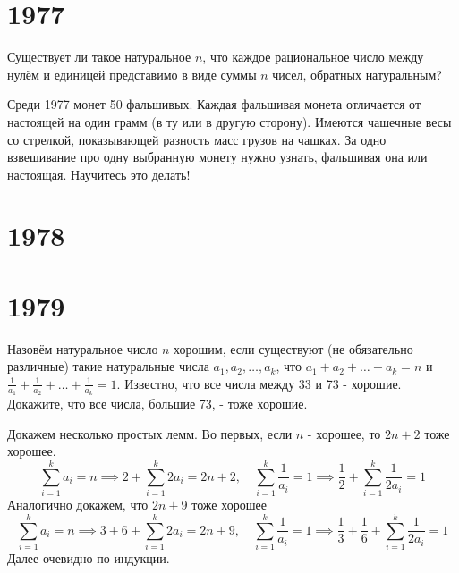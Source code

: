 \documentclass[11pt, a4paper]{template}
\begin{document}
\chapter{1977}

\begin{exercise}[M425]
Существует ли такое натуральное $n$, что каждое рациональное число между нулём и единицей представимо в виде суммы $n$ чисел, обратных натуральным?
\end{exercise}

\begin{exercise}[M466]
Среди 1977 монет 50 фальшивых. Каждая фальшивая монета отличается от настоящей на один грамм (в ту или в другую сторону). Имеются чашечные весы со стрелкой, показывающей разность масс грузов на чашках. За одно взвешивание про одну выбранную монету нужно узнать, фальшивая она или настоящая. Научитесь это делать!
\end{exercise}

\chapter{1978}

\chapter{1979}

\begin{exercise}[M554]
Назовём натуральное число $n$ хорошим, если существуют (не обязательно различные) такие натуральные числа $a_{1}, a_{2}, \dots, a_{k}$, что $a_{1} + a_{2} + \dots + a_{k} = n$ и $\frac{1}{a_{1}} + \frac{1}{a_{2}} + \dots + \frac{1}{a_{k}} = 1$. Известно, что все числа между 33 и 73 - хорошие. Докажите, что все числа, большие 73, - тоже хорошие.
\end{exercise}

\begin{solution}
Докажем несколько простых лемм. Во первых, если $n$ - хорошее, то $2n + 2$ тоже хорошее. 
$$
\sum_{i = 1}^{k} a_{i} = n \implies 2 + \sum_{i = 1}^{k} 2a_{i} = 2n + 2, \quad \sum_{i = 1}^{k} \frac{1}{a_{i}} = 1 \implies \frac{1}{2} + \sum_{i = 1}^{k} \frac{1}{2a_{i}} = 1
$$
Аналогично докажем, что $2n+9$ тоже хорошее
$$
\sum_{i = 1}^{k} a_{i} = n \implies 3 + 6 + \sum_{i = 1}^{k} 2a_{i} = 2n + 9, \quad \sum_{i = 1}^{k} \frac{1}{a_{i}} = 1 \implies \frac{1}{3} + \frac{1}{6} + \sum_{i = 1}^{k} \frac{1}{2a_{i}} = 1
$$
Далее очевидно по индукции.
\end{solution}
\end{document}
